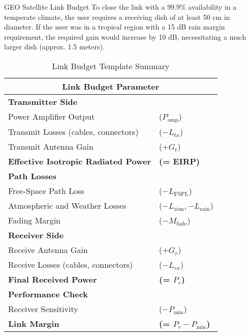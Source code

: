 \begin{workedexample}{GEO Satellite Link Budget}
     To close the link with a 99.9\% availability in a temperate climate, the user requires a receiving dish of at least 50 cm in diameter. If the user was in a tropical region with a 15 dB rain margin requirement, the required gain would increase by 10 dB, necessitating a much larger dish (approx. 1.5 meters).
\end{workedexample}

\begin{table}[H]
    \centering
    \caption{Link Budget Template Summary}
    \label{tab:link-budget-template}
    \begin{tabular}{@{}ll@{}}
        \toprule
        \multicolumn{2}{c}{\tableheaderfont Link Budget Parameter} \\
        \midrule
        \textbf{Transmitter Side} & \\
        \quad Power Amplifier Output & ($P_{\text{amp}}$) \\
        \quad Transmit Losses (cables, connectors) & ($-L_{tx}$) \\
        \quad Transmit Antenna Gain & ($+G_t$) \\
        \textbf{Effective Isotropic Radiated Power} & \textbf{(= EIRP)} \\
        \addlinespace
        \textbf{Path Losses} & \\
        \quad Free-Space Path Loss & ($-L_{\text{FSPL}}$) \\
        \quad Atmospheric and Weather Losses & ($-L_{\text{atm}}, -L_{\text{rain}}$) \\
        \quad Fading Margin & ($-M_{\text{fade}}$) \\
        \addlinespace
        \textbf{Receiver Side} & \\
        \quad Receive Antenna Gain & ($+G_r$) \\
        \quad Receive Losses (cables, connectors) & ($-L_{rx}$) \\
        \textbf{Final Received Power} & \textbf{(= $P_r$)} \\
        \addlinespace
        \textbf{Performance Check} & \\
        \quad Receiver Sensitivity & ($-P_{\text{min}}$) \\
        \textbf{Link Margin} & \textbf{(= $P_r - P_{\text{min}}$)} \\
        \bottomrule
    \end{tabular}
\end{table}


